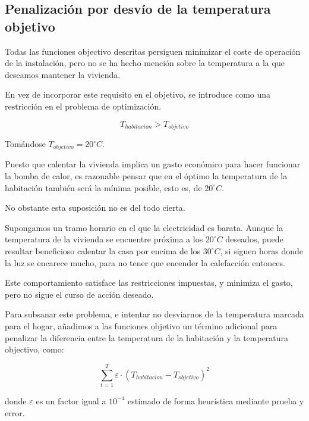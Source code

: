 \subsection{Penalización por desvío de la temperatura objetivo}

Todas las funciones objectivo descritas persiguen minimizar el coste de
operación de la instalación, pero no se ha hecho mención sobre la temperatura a
la que deseamos mantener la vivienda.

En vez de incorporar este requisito en el objetivo, se introduce como una
restricción en el problema de optimización.

\begin{equation}
	T_{habitacion} > T_{objetivo}
\end{equation}

Tomándose $T_{objetivo} = 20 ^\circ C$.

Puesto que calentar la vivienda implica un gasto económico para hacer funcionar la bomba de calor,
es razonable pensar que en el óptimo la temperatura de la habitación también será la mínima posible,
esto es, de $20 ^\circ C$.

No obstante esta suposición no es del todo cierta.

Supongamos un tramo horario en el que la electricidad es barata. Aunque la
temperatura de la vivienda se encuentre próxima a los $20 ^\circ C$ deseados,
puede resultar beneficioso calentar la casa por encima de los $30 ^\circ C$, si
siguen horas donde la luz se encarece mucho, para no tener que encender la
calefacción entonces.

Este comportamiento satisface las restricciones impuestas, y minimiza el gasto, pero
no sigue el curso de acción deseado.

Para subsanar este problema, e intentar no desviarnos de la temperatura marcada para
el hogar, añadimos a las funciones objetivo un término adicional para penalizar
la diferencia entre la temperatura de la habitación y la temperatura objectivo, como:

\begin{equation}
	\sum_{t=1}^{T} \varepsilon \cdot (T_{habitacion} - T_{objetivo})^2
\end{equation}

donde $\varepsilon$ es un factor igual a $10^{-4}$ estimado de forma heurística
mediante prueba y error.
